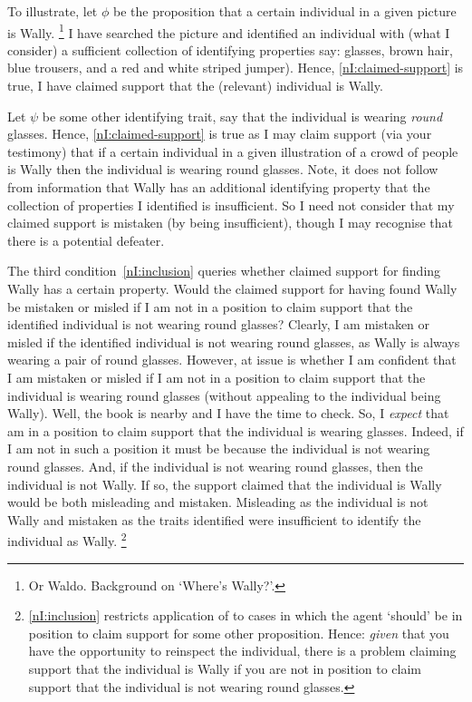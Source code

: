 \begin{note}[Illustration]
  To illustrate, let \(\phi\) be the proposition that a certain individual in a given picture is Wally.\nolinebreak
  \footnote{
    Or Waldo.
    Background on `Where's Wally?'.
  }
  I have searched the picture and identified an individual with (what I consider) a sufficient collection of identifying properties say: glasses, brown hair, blue trousers, and a red and white striped jumper).
  Hence, \ref{nI:claimed-support} is true, I have claimed support that the (relevant) individual is Wally.

  Let \(\psi\) be some other identifying trait, say that the individual is wearing \emph{round} glasses.
  Hence, \ref{nI:claimed-support} is true as I may claim support (via your testimony) that if a certain individual in a given illustration of a crowd of people is Wally then the individual is wearing round glasses.
  Note, it does not follow from information that Wally has an additional identifying property that the collection of properties I identified is insufficient.
  So I need not consider that my claimed support is mistaken (by being insufficient), though I may recognise that there is a potential defeater.

  The third condition~\ref{nI:inclusion} queries whether claimed support for finding Wally has a certain property.
  Would the claimed support for having found Wally be mistaken or misled if I am not in a position to claim support that the identified individual is not wearing round glasses?
  Clearly, I am mistaken or misled if the identified individual is not wearing round glasses, as Wally is always wearing a pair of round glasses.
  However, at issue is whether I am confident that I am mistaken or misled if I am not in a position to claim support that the individual is wearing round glasses (without appealing to the individual being Wally).
  Well, the book is nearby and I have the time to check.
  So, I \emph{expect} that am in a position to claim support that the individual is wearing glasses.
  Indeed, if I am not in such a position it must be because the individual is not wearing round glasses.
  And, if the individual is not wearing round glasses, then the individual is not Wally.
  If so, the support claimed that the individual is Wally would be both misleading and mistaken.
  Misleading as the individual is not Wally and mistaken as the traits identified were insufficient to identify the individual as Wally.\nolinebreak
  \footnote{
    \ref{nI:inclusion} restricts application of \nI{} to cases in which the agent `should' be in position to claim support for some other proposition.
    Hence: \emph{given} that you have the opportunity to reinspect the individual, there is a problem claiming support that the individual is Wally if you are not in position to claim support that the individual is not wearing round glasses.

}
\end{note}
